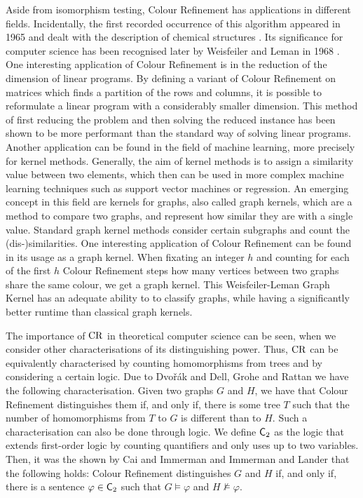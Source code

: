 Aside from isomorphism testing, Colour Refinement has applications in different fields.
Incidentally, the first recorded occurrence of this algorithm appeared in 1965 and dealt with the description of chemical structures \cite{morgan1965GenerationUnique}.
Its significance for computer science has been recognised later by Weisfeiler and Leman in 1968 \cite{weisfeiler1968reduction}.
One interesting application of Colour Refinement is in the reduction of the dimension of linear programs.
By defining a variant of Colour Refinement on matrices which finds a partition of the rows and columns, it is possible to reformulate a linear program with a considerably smaller dimension. 
This method of first reducing the problem and then solving the reduced instance has been shown to be more performant than the standard way of solving linear programs. \cite{grohe2014DimensionReduction}
Another application can be found in the field of machine learning, more precisely for kernel methods.
Generally, the aim of kernel methods is to assign a similarity value between two elements, which then can be used in more complex machine learning techniques such as support vector machines or regression.
An emerging concept in this field are kernels for graphs, also called graph kernels, which are a method to compare two graphs, and represent how similar they are with a single value.
Standard graph kernel methods consider certain subgraphs and count the (dis-)similarities. \cite{vishwanathan2010graph}
One interesting application of Colour Refinement can be found in its usage as a graph kernel.
When fixating an integer $h$ and counting for each of the first $h$ Colour Refinement steps how many vertices between two graphs share the same colour, we get a graph kernel.
This Weisfeiler-Leman Graph Kernel has an adequate ability to to classify graphs, while having a significantly better runtime than classical graph kernels. \cite{grohe2021ColorRefinement}

The importance of $\operatorname{CR}$ in theoretical computer science can be seen, when  we consider other characterisations of its distinguishing power.
Thus, $\operatorname{CR}$ can be equivalently characterised by counting homomorphisms from trees and by considering a certain logic.
Due to Dvo\v r\'ak \cite{dvorak2010RecognizingGraphsa} and Dell, Grohe and Rattan \cite{dell2018LovaszMeets} we have the following characterisation.
Given two graphs $G$ and $H$, we have that Colour Refinement distinguishes them if, and only if, there is some tree $T$ such that the number of homomorphisms from $T$ to $G$ is different than to $H$.
Such a characterisation can also be done through logic.
We define $\mathsf{C}_{2}$ as the logic that extends first-order logic by counting quantifiers and only uses up to two variables.
Then, it was the shown by Cai and Immerman \cite{cai1992OptimalLower} and Immerman and Lander \cite{immerman1990DescribingGraphs} that the following holds: 
Colour Refinement distinguishes $G$ and $H$ if, and only if, there is a sentence $\varphi\in\mathsf{C}_{2}$ such that $G\models \varphi$ and $ H\not\models \varphi$.

